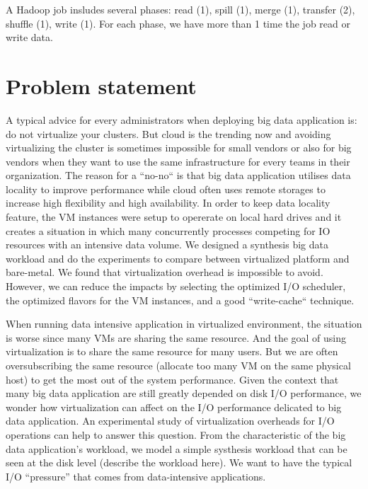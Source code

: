 \documentclass{acmsig}
\begin{document}
A Hadoop job insludes several phases: read (1), spill (1), merge (1), transfer (2), shuffle (1), write (1). For each phase, we have more than 1 time the job read or write data.




\section{Problem statement}

A typical advice for every administrators when deploying big data application is: do not virtualize your clusters. But cloud is the trending now and avoiding virtualizing the cluster is sometimes impossible for small vendors or also for big vendors when they want to use the same infrastructure for every teams in their organization. The reason for a ``no-no`` is that big data application utilises data locality to improve performance while cloud often uses remote storages to increase high flexibility and high availability. In order to keep data locality feature, the VM instances were setup to opererate on local hard drives and it creates a situation in which many concurrently processes competing for IO resources with an intensive data volume. We designed a synthesis big data workload and do the experiments to compare between virtualized platform and bare-metal. We found that virtualization overhead is impossible to avoid. However, we can reduce the impacts by selecting the optimized I/O scheduler, the optimized flavors for the VM instances, and a good ``write-cache`` technique.

When running data intensive application in virtualized environment, the situation is worse since many VMs are sharing the same resource.
And the goal of using virtualization is to share the same resource for many users.  But we are often oversubscribing the same resource (allocate too many VM on the same physical host) to get the most out of the system performance. Given the context that many big data application are still greatly depended on disk I/O performance, we wonder how virtualization can affect on the I/O performance delicated to big data application. An experimental study of virtualization overheads for I/O operations can help to answer this question. From the characteristic of the big data application's workload, we model a simple systhesis workload that can be seen at the disk level (describe the workload here). We want to have the typical I/O ``pressure'' that comes from data-intensive applications.
\end{document}
